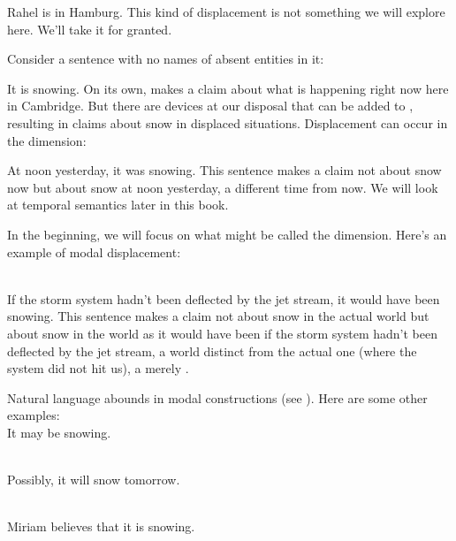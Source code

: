 \ex Rahel is in Hamburg. \xe
%
This kind of displacement is not something we will explore here. We'll take it
for granted.

Consider a sentence with no names of absent entities in it:

\ex It is snowing. \xe
%
On its own, \Last makes a claim about what is happening right now here in
Cambridge. But there are devices at our disposal that can be added to \Last,
resulting in claims about snow in displaced situations. Displacement can occur
in the  dimension: 

\ex At noon yesterday, it was snowing. \xe
%
This sentence makes a claim not about snow now but about snow at noon yesterday,
a different time from now. We will look at temporal semantics later in this
book.

\kwn%
%
%
In the beginning, we will focus on what might be called the 
dimension. Here's an example of modal displacement:

\ex {}\\
If the storm system hadn't been deflected by the jet stream, it would have
been snowing. \xe
%
This sentence makes a claim not about snow in the actual world but about snow in
the world as it would have been if the storm system hadn't been deflected by the
jet stream, a world distinct from the actual one (where the system did not hit
us), a merely .

Natural language abounds in modal constructions (see
\cite{kratzer-1981-notional}). Here are some other examples:
%
%
\ex {}\\
It may be snowing. \xe

\ex~ \\
Possibly, it will snow tomorrow. \xe

\ex~ \\
Miriam believes that it is snowing. \xe

